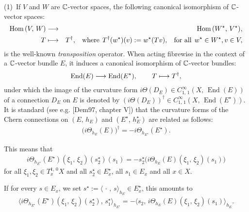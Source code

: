 \documentclass[12pt]{article}
\begin{document}
  (1)\, If $V$ and $W$ are $\mathbb{C}$-vector spaces, the following canonical isomorphism of $\mathbb{C}$-vector spaces: \begin{eqnarray*}\mbox{Hom}\,(V,\,W) &\longrightarrow & \mbox{Hom}\,(W^\star,\,V^\star), \\
  T & \longmapsto & T^{\dagger}, \hspace{2ex} \mbox{where} \hspace{1ex} T^{\dagger}(w^\star)(v):= w^\star(Tv), \hspace{2ex} \mbox{for all} \hspace{1ex} w^\star\in W^\star, v\in V,\end{eqnarray*} is the well-known {\it transposition} operator. When acting fibrewise in the context of a $\mathbb{C}$-vector bundle $E$, it induces a canonical isomorphism of $\mathbb{C}$-vector bundles: \begin{eqnarray*}\operatorname{End} (E) \longrightarrow \operatorname{End} (E^\star), \hspace{5ex} T \longmapsto T^{\dagger},\end{eqnarray*} under which the image of the curvature form $i\Theta(D_E)\in C^\infty_{1,\,1}(X,\,\operatorname{End} (E))$ of a connection $D_E$ on $E$ is denoted by $(i\Theta(D_E))^{\dagger}\in C^\infty_{1,\,1}(X,\,\operatorname{End} (E^\star))$. It is standard (see e.g. [Dem97, chapter V]) that the curvature forms of the Chern connections on $(E,\,h_E)$ and $(E^\star,\,h_E^\star)$ are related as follows: \begin{eqnarray}\label{eqn:curvature_E-star_dagger}\bigg(i\Theta_{h_E}(E)\bigg)^{\dagger} = -i\Theta_{h_{E^\star}}(E^\star).\end{eqnarray}

This means that \begin{eqnarray*}i\Theta_{h_{E^\star}}(E^\star)(\xi_1,\,\xi_2)(s_2^\star)(s_1) = -s_2^\star\bigg(i\Theta_{h_E}(E)(\xi_1,\,\xi_2)(s_1)\bigg)\end{eqnarray*} for all $\xi_1,\xi_2\in T^{1,\,0}_xX$ and all $s_2^\star\in E^\star_x$, all $s_1\in E_x$ and all $x\in X$.

If for every $s\in E_x$, we set $s^\star:=\langle\,\cdot\,,\,s\rangle_{h_E}\in E^\star_x$, this amounts to \begin{eqnarray*}\bigg\langle i\Theta_{h_{E^\star}}(E^\star)(\xi_1,\,\xi_2)(s_2^\star),\, s_1^\star\bigg\rangle_{h_{E^\star}} = - \bigg\langle s_2,\, i\Theta_{h_E}(E)(\xi_1,\,\xi_2)(s_1)\bigg\rangle_{h_E}.\end{eqnarray*}
\end{document}
